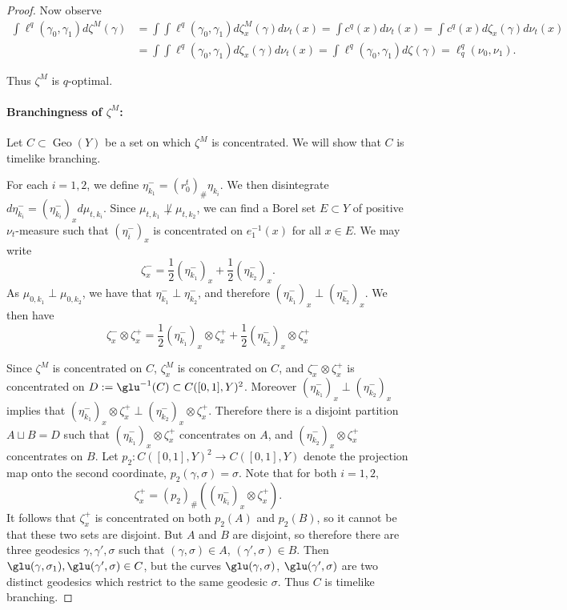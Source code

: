 \documentclass{article}
\DeclareMathOperator{\Geo}{Geo}
\theoremstyle{definition}
\begin{document}
{\begin{proof}
Now observe 
\begin{align*}
 \int \ell^q(\gamma_0,\gamma_1) d\zeta^M(\gamma) &= \int \int \ell^q(\gamma_0,\gamma_1)d \zeta^M_x(\gamma)d\nu_t(x) = \int c^q(x)d\nu_t(x)=\int c^q(x) d\zeta_x(\gamma) d\nu_t(x)\\
 &=\int\int \ell^q(\gamma_0,\gamma_1)d \zeta_x(\gamma)d\nu_t(x)=\int \ell^q(\gamma_0,\gamma_1) d\zeta(\gamma) = \ell_q^q(\nu_0,\nu_1).\end{align*}

Thus $\zeta^M$ is $q$-optimal. 

\paragraph{Branchingness of $\zeta^M$:}
Let $C\subset \Geo(Y)$ be a set on which $\zeta^M$ is concentrated. We will show that $C$ is timelike branching. 

For each $i=1,2$, we define $\eta^-_{k_1}= (r_0^t)_\# \eta_{k_i}$. We then disintegrate $d\eta^-_{k_i} = (\eta^-_{k_i})_x d\mu_{t,k_i}$. Since $\mu_{t,k_1}\not\perp \mu_{t,k_2}$, we can find a Borel set $E\subset Y$ of positive $\nu_t$-measure such that $(\eta^-_i)_x$ is concentrated on $e_1^{-1}(x)$ for all $x\in E$. We may write 
\[\zeta^-_x= \frac 12(\eta^-_{k_1})_x+\frac 12 (\eta^-_{k_2})_x.\]
 As $\mu_{0,k_1}\perp \mu_{0,k_2}$, we have that $\eta^-_{k_1}\perp \eta^-_{k_2}$, and therefore $(\eta^-_{k_1})_x\perp (\eta^-_{k_2})_x$.  We then have 
 \[\zeta^-_x\otimes \zeta^+_x = \frac 12(\eta^-_{k_1})_x\otimes \zeta^+_x+\frac12(\eta^-_{k_2})_x\otimes \zeta^+_x \]
 
 Since $\zeta^M$ is concentrated on $C$, $\zeta^M_x$ is concentrated on $C$, and $\zeta^-_x\otimes \zeta^+_x $ is concentrated on $D:= \glu^{-1}(C)\subset C([0,1],Y)^2$. Moreover $(\eta^-_{k_1})_x\perp (\eta^-_{k_2})_x$ implies that $(\eta^-_{k_1})_x\otimes \zeta^+_x\perp (\eta^-_{k_2})_x\otimes \zeta^+_x$. Therefore there is a disjoint partition $A\sqcup B = D$ such that $(\eta^-_{k_1})_x\otimes \zeta^+_x$ concentrates on $A$, and $(\eta^-_{k_2})_x\otimes \zeta^+_x$ concentrates on $B$. Let $p_2:C([0,1],Y)^2\to C([0,1], Y)$ denote the projection map onto the second coordinate, $p_2(\gamma, \sigma)=\sigma$.  Note that for both $i=1,2$, 
 \[\zeta_x^+=(p_2)_\# ((\eta^-_{k_i})_x\otimes \zeta^+_x).\]
It follows that $\zeta_x^+$ is concentrated on both $p_2(A)$ and $p_2(B)$, so it cannot be that these two sets are disjoint. But $A$ and $B$ are disjoint, so therefore there are three geodesics $\gamma,\gamma', \sigma$ such that $(\gamma,\sigma)\in A$, $(\gamma',\sigma)\in B$. Then $\glu(\gamma,\sigma_1), \glu(\gamma',\sigma)\in C$, but the curves $\glu(\gamma, \sigma)$, $\glu(\gamma', \sigma)$ are two distinct geodesics which restrict to the same geodesic $\sigma$. Thus $C$ is timelike branching. 
\end{proof}




}
\end{document}
